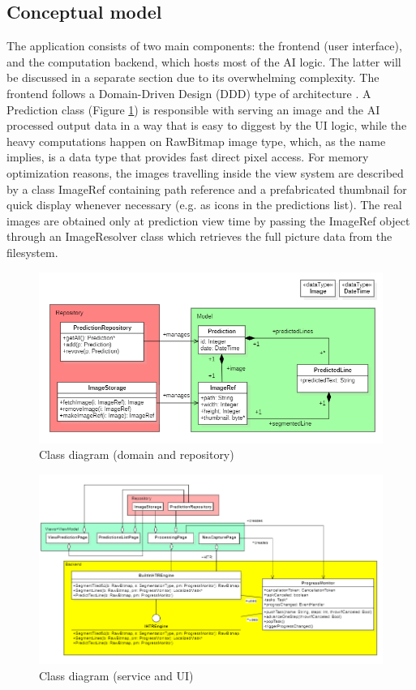 \subsection{Conceptual model}

The application consists of two main components: the frontend (user interface), and the computation backend, which hosts most of the AI logic. The latter will be discussed in a separate section due to its overwhelming complexity. The frontend follows a Domain-Driven Design (DDD) type of architecture \cite{DDD}. A Prediction class (Figure \ref{FigClassDiagDomRepo}) is responsible with serving an image and the AI processed output data in a way that is easy to diggest by the UI logic, while the heavy computations happen on RawBitmap image type, which, as the name implies, is a data type that provides fast direct pixel access. For memory optimization reasons, the images travelling inside the view system are described by a class ImageRef containing path reference and a prefabricated thumbnail for quick display whenever necessary (e.g. as icons in the predictions list). The real images are obtained only at prediction view time by passing the ImageRef object through an ImageResolver class which retrieves the full picture data from the filesystem.

\begin{figure}[htbp]
	\centering
		\includegraphics[scale=0.7]{figures/class_diagram_domain_repo.png}
	\caption{Class diagram (domain and repository)}
        \label{FigClassDiagDomRepo}
\end{figure}

\begin{figure}[htbp]
	\centering
		\includegraphics[scale=0.65]{figures/class_diagram_service.png}
	\caption{Class diagram (service and UI)}
        \label{FigClassDiagService}
\end{figure}


